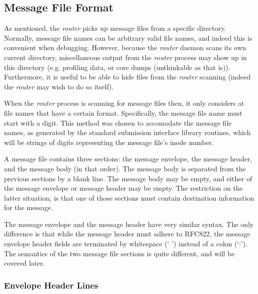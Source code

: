 
\subsection{Message File Format}

As mentioned, the {\em router\/} picks up message files from a specific directory.
Normally, message file names can be arbitrary valid file names, and indeed
this is convenient when debugging.  However, because the {\em router\/} daemon
scans its own current directory, miscellaneous output from the {\em router\/}
process may show up in this directory (e.g. profiling data, or core dumps
(unthinkable as that is)).  Furthermore, it is useful to be able to hide
files from the {\em router\/} scanning (indeed the {\em router\/} may wish to do so
itself).

When the {\em router\/} process is scanning for message files then, it only
considers at file names that have a certain format.  Specifically, the
message file name must start with a digit.  This method was chosen to
accomodate the message file names, as generated by the standard submission
interface library routines, which will be strings of digits representing
the message file's inode number.

A message file contains three sections: the message envelope, the message
header, and the message body (in that order).  The message body is
separated from the previous sections by a blank line.  The message body may
be empty, and either of the message envelope or message header may be
empty.  The restriction on the latter situation, is that one of those
sections must contain destination information for the message.

The message envelope and the message header have very similar syntax.  The
only difference is that while the message header must adhere to RFC822, the
message envelope header fields are terminated by whitespace (` ') instead
of a colon (`:').  The semantics of the two message file sections is quite
different, and will be covered later.




\subsubsection{Envelope Header Lines}




